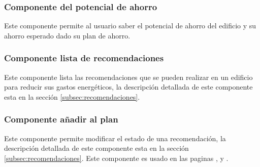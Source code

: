 \subsubsection{Componente del potencial de ahorro}

Este componente permite al usuario saber el potencial de ahorro del edificio y su
ahorro esperado dado su plan de ahorro.

\subsubsection{Componente lista de recomendaciones}

Este componente lista las recomendaciones que se pueden realizar en un edificio para
reducir sus gastos energéticos, la descripción detallada de este componente esta en
la sección \ref{subsec:recomendaciones}.

\subsubsection{Componente añadir al plan}

Este componente permite modificar el estado de una recomendación,
la descripción detallada de este componente esta en la sección
\ref{subsec:recomendaciones}. Este componente es usado en las paginas
,  y
.
